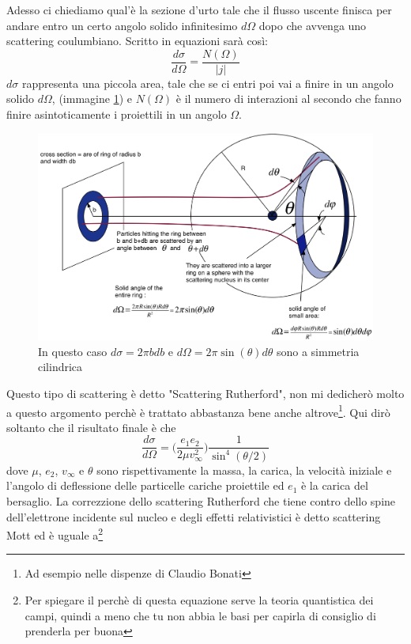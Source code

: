 \documentclass[11pt,a4paper]{article}
\begin{document}
		Adesso ci chiediamo qual'è la sezione d'urto tale che il flusso uscente finisca per andare entro un certo angolo solido infinitesimo $d\Omega$ dopo che avvenga uno scattering coulumbiano. Scritto in equazioni sarà così:
		\begin{equation}
			\frac{d\sigma}{d\Omega}=\frac{N(\Omega)}{|j|}
			\label{eq:sez_diff}
		\end{equation}
		$d\sigma$ rappresenta una piccola area, tale che se ci entri poi vai a finire in un angolo solido $d\Omega$, (immagine \ref{fig:rut1}) e $N(\Omega)$ è il numero di interazioni al secondo che fanno finire asintoticamente i proiettili in un angolo $\Omega$.\newline
		\begin{figure}
			\centering
    		\includegraphics[width=\linewidth]{Immagini/solid_angle.png}
    		\caption{In questo caso $d\sigma=2\pi b db$ e $d\Omega=2\pi \sin(\theta)d\theta$ sono a simmetria cilindrica}
    		\label{fig:rut1}
		\end{figure}
		Questo tipo di scattering è detto "Scattering Rutherford", non mi dedicherò molto a questo argomento perchè è trattato abbastanza bene anche altrove\footnote{Ad esempio nelle dispenze di Claudio Bonati}. Qui dirò soltanto che il risultato finale è che
		\begin{equation}
			\frac{d\sigma}{d\Omega}=\Big(\frac{e_1e_2}{2\mu v_\infty^2 }\Big)\frac{1}{\sin^4(\theta/2)}
		\end{equation}
		dove $\mu$, $e_2$, $v_\infty$ e $\theta$ sono rispettivamente la massa, la carica, la velocità iniziale e l'angolo di deflessione delle particelle cariche proiettile ed $e_1$ è la carica del bersaglio.\newline
		La correzzione dello scattering Rutherford che tiene contro dello spine dell'elettrone incidente sul nucleo e degli effetti relativistici è detto scattering Mott ed è uguale a\footnote{Per spiegare il perchè di questa equazione serve la teoria quantistica dei campi, quindi a meno che tu non abbia le basi per capirla di consiglio di prenderla per buona}
\end{document}
